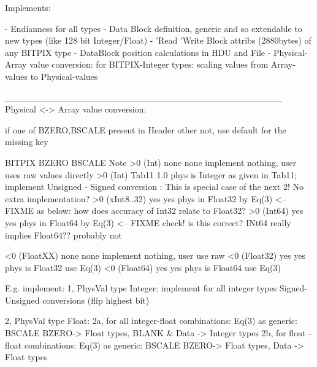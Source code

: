 


Implements:

- Endianness for all types
- Data Block definition, generic and so extendable to new types (like 128 bit Integer/Float)
- 'Read 'Write Block attribs (2880bytes) of any BITPIX type
- DataBlock position calculations in HDU and File
- Physical-Array value conversion: for BITPIX-Integer types: scaling values from Array-values to Physical-values

___________________________________________
Physical <-> Array value conversion:

if one of BZERO,BSCALE present in Header other not, use default for the missing key

BITPIX   	BZERO 	BSCALE		Note
 >0 (Int)	none	none		implement nothing, user uses raw values directly
 >0 (Int)	Tab11	1.0		phys is Integer as given in Tab11; implement Unsigned - Signed conversion : This is special case of the next 2! No extra implementation?
 >0 (xInt8..32)	yes	yes		phys in Float32	by Eq(3) <-- FIXME as below: how does accuracy of Int32 relate to Float32?
 >0 (Int64)	yes	yes		phys in Float64	by Eq(3) <-- FIXME check! is this correct? INt64 really implies Float64?? probably not

 <0 (FloatXX)	none	none		implement nothing, user use raw
 <0 (Float32)	yes	yes		phys is Float32 use Eq(3)
 <0 (Float64)	yes	yes		phys is Float64 use Eq(3)

E.g. implement:
1, PhysVal type Integer: implement for all integer types Signed-Unsigned conversions (flip highest bit)

2, PhysVal type Float:
2a, for all integer-float combinations: Eq(3) as generic: BSCALE BZERO-> Float types,  BLANK & Data -> Integer types
2b, for     float  -float combinations: Eq(3) as generic: BSCALE BZERO-> Float types,  Data -> Float types
